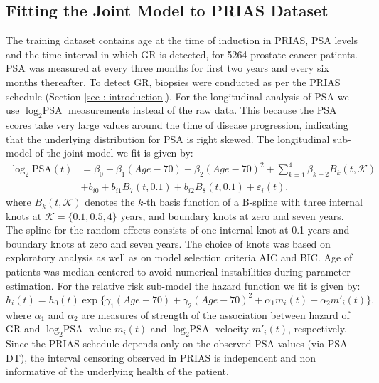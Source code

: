\subsection{Fitting the Joint Model to PRIAS Dataset}
\label{subsec : jm_fit_prias}
The training dataset contains age at the time of induction in PRIAS, PSA levels and the time interval in which GR is detected, for 5264 prostate cancer patients. PSA was measured at every three months for first two years and every six months thereafter. To detect GR, biopsies were conducted as per the PRIAS schedule (Section \ref{sec : introduction}). For the longitudinal analysis of PSA we use $\log_2 \mbox{PSA}$ measurements instead of the raw data. This because the PSA scores take very large values around the time of disease progression, indicating that the underlying distribution for PSA is right skewed. The longitudinal sub-model of the joint model we fit is given by:
\begin{equation}
\label{eq : long_model_prias}
\begin{aligned}
\log_2 \mbox{PSA}(t) &= \beta_0 + \beta_1 (Age-70) + \beta_2 (Age-70)^2 + \sum_{k=1}^4 \beta_{k+2} B_k(t,\mathcal{K})\\ 
&+  b_{i0} + b_{i1} B_7(t, 0.1) + b_{i2} B_8(t, 0.1) +
\varepsilon_i(t).
\end{aligned}
\end{equation}
where $B_k(t, \mathcal{K})$ denotes the $k$-th basis function of a B-spline with three internal knots at $\mathcal{K} =\{0.1, 0.5, 4\}$ years, and boundary knots at zero and seven years. The spline for the random effects consists of one internal knot at 0.1 years and boundary knots at zero and seven years. The choice of knots was based on exploratory analysis as well as on model selection criteria AIC and BIC. Age of patients was median centered to avoid numerical instabilities during parameter estimation. For the relative risk sub-model the hazard function we fit is given by:
\begin{equation}
\label{eq : hazard_prias}
h_i(t) = h_0(t) \exp\big\{\gamma_1 (Age-70)  + \gamma_2 (Age-70)^2 + \alpha_1 m_i(t) + \alpha_2 m'_i(t)\big\}.
\end{equation}
where $\alpha_1$ and $\alpha_2$ are measures of strength of the association between hazard of GR and $\log_2 \mbox{PSA}$ value $m_i(t)$ and $\log_2 \mbox{PSA}$ velocity $m'_i(t)$, respectively. Since the PRIAS schedule depends only on the observed PSA values (via PSA-DT), the interval censoring observed in PRIAS is independent and non informative of the underlying health of the patient.

